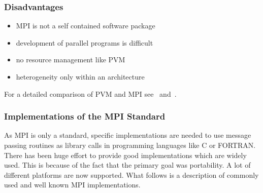 \subsubsection{Disadvantages}
\begin{itemize}
\item MPI is not a self contained software package
\item development of parallel programs is difficult
\item no resource management like PVM 
\item heterogeneity only within an architecture
\end{itemize}


For a detailed comparison of PVM and MPI see~\cite{geist96pam}
and~\cite{gropp02ggd}.

\subsubsection{Implementations of the MPI Standard}
\label{sec:mpi-implementations}

As MPI is only a standard, specific implementations are needed to use
message passing routines as library calls in programming languages
like C or FORTRAN. There has been huge effort to provide good
implementations which are widely used. This is because of the fact that
the primary goal was portability. A lot of different platforms are now
supported. What follows is a description of commonly used and well
known MPI implementations.

